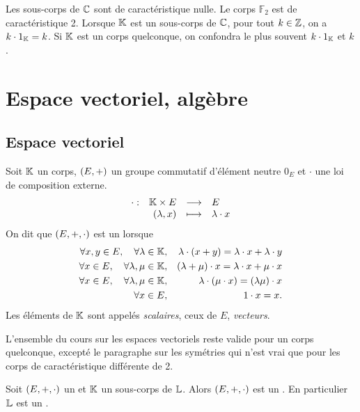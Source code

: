 \documentclass{magnolia}
\begin{document}
\begin{remarques}
\remarque Les sous-corps de $\mathbb{C}$ sont de caractéristique nulle. Le corps $\mathbb{F}_2$ est de caractéristique 2.
\remarque Lorsque $\mathbb{K}$ est un sous-corps de $\mathbb{C}$, pour tout $k\in\mathbb{Z}$, on a $k\cdot 1_{\mathbb{K}}=k$. Si $\mathbb{K}$ est un corps
  quelconque, on confondra le plus souvent $k\cdot 1_{\mathbb{K}}$ et $k$.
\end{remarques}

\section{Espace vectoriel, algèbre}
\subsection{Espace vectoriel}


\begin{definition}[utile=-3]
Soit $\mathbb{K}$ un corps, $\left(E,+\right)$ un groupe commutatif d'élément neutre $0_E$ et
$\cdot$ une loi de composition externe.
\[\begin{array}[t]{lrcl} \displaystyle{\cdot} : & \displaystyle{\ensuremath{\mathbb{K}}\times E} & \longrightarrow & \displaystyle{E} \\ & \displaystyle{\left(\lambda,x\right)} & \longmapsto & \displaystyle{\lambda\cdot x} \end{array}\]
On dit que $\left(E,+,\cdot\right)$ est un \emph{\Kev} lorsque
\begin{eqnarray*}
\forall x,y\in E ,\quad \forall \lambda\in\mathbb{K}, & &
  \lambda\cdot\left(x+y\right)=\lambda\cdot x+\lambda\cdot y\\
\forall x\in E ,\quad \forall \lambda,\mu\in\mathbb{K}, & &
  \left(\lambda+\mu\right)\cdot x=\lambda\cdot x+\mu\cdot x\\
\forall x\in E ,\quad \forall \lambda,\mu\in\mathbb{K}, & &
  \lambda\cdot\left(\mu\cdot x\right)=\left(\lambda\mu\right)\cdot x\\
\forall x\in E, & & 1\cdot x=x.
\end{eqnarray*}
Les éléments de $\mathbb{K}$ sont appelés \emph{scalaires}, ceux de $E$, \emph{vecteurs}.
\end{definition}

\begin{remarqueUnique}
\remarque L'ensemble du cours sur les espaces vectoriels reste valide pour un corps quelconque, excepté le paragraphe
  sur les symétries qui n'est vrai que pour les corps de caractéristique différente de 2.
\end{remarqueUnique}

\begin{proposition}[utile=1]
Soit $\left(E,+,\cdot\right)$ un \Lev et $\mathbb{K}$ un sous-corps de $\mathbb{L}$. Alors
$\left(E,+,\cdot\right)$ est un \Kev. En particulier $\mathbb{L}$ est un \Kev. 
\end{proposition}
\end{document}
